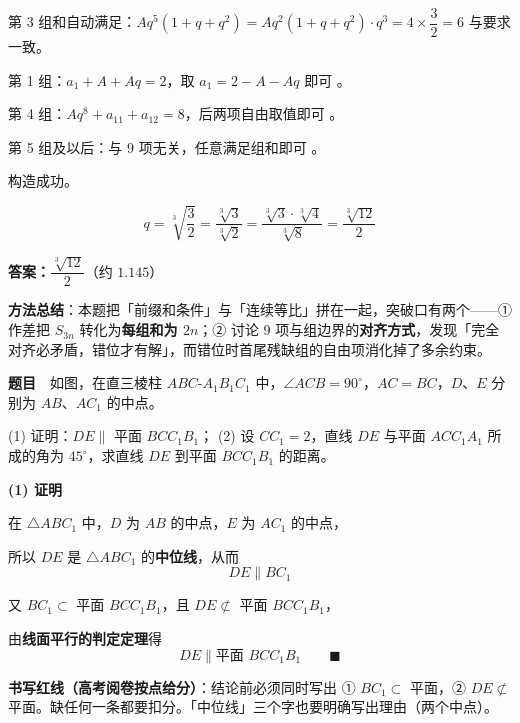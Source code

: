 第 3 组和自动满足：$Aq^5(1+q+q^2)=Aq^2(1+q+q^2)\cdot q^3=4\times\dfrac32=6$  与要求一致。

第 1 组：$a_1+A+Aq=2$，取 $a_1=2-A-Aq$ 即可 。

第 4 组：$Aq^8+a_{11}+a_{12}=8$，后两项自由取值即可 。

第 5 组及以后：与 9 项无关，任意满足组和即可 。

构造成功。


\[q=\sqrt[3]{\frac32}=\frac{\sqrt[3]{3}}{\sqrt[3]{2}}=\frac{\sqrt[3]{3}\cdot\sqrt[3]{4}}{\sqrt[3]{8}}=\frac{\sqrt[3]{12}}{2}\]

\textbf{答案：$\dfrac{\sqrt[3]{12}}{2}$}（约 $1.145$）

\begin{gktip}
\textbf{方法总结}：本题把「前缀和条件」与「连续等比」拼在一起，突破口有两个——① 作差把 $S_{3n}$ 转化为\textbf{每组和为 $2n$}；② 讨论 9 项与组边界的\textbf{对齐方式}，发现「完全对齐必矛盾，错位才有解」，而错位时首尾残缺组的自由项消化掉了多余约束。
\end{gktip}

\par\medskip



\textbf{题目}　如图，在直三棱柱 $ABC\text{-}A_1B_1C_1$ 中，$\angle ACB=90^\circ$，$AC=BC$，$D$、$E$ 分别为 $AB$、$AC_1$ 的中点。

\begin{center}\end{center}

  (1) 证明：$DE\parallel$ 平面 $BCC_1B_1$；
  (2) 设 $CC_1=2$，直线 $DE$ 与平面 $ACC_1A_1$ 所成的角为 $45^\circ$，求直线 $DE$ 到平面 $BCC_1B_1$ 的距离。

\par\medskip

\textbf{(1) 证明}

在 $\triangle ABC_1$ 中，$D$ 为 $AB$ 的中点，$E$ 为 $AC_1$ 的中点，

所以 $DE$ 是 $\triangle ABC_1$ 的\textbf{中位线}，从而
\[DE\parallel BC_1\]

又 $BC_1\subset$ 平面 $BCC_1B_1$，且 $DE\not\subset$ 平面 $BCC_1B_1$，

由\textbf{线面平行的判定定理}得
\[DE\parallel\text{平面 }BCC_1B_1\qquad\blacksquare\]

\begin{gktip}
\textbf{书写红线（高考阅卷按点给分）}：结论前必须同时写出 ① $BC_1\subset$ 平面，② $DE\not\subset$ 平面。缺任何一条都要扣分。「中位线」三个字也要明确写出理由（两个中点）。
\end{gktip}

